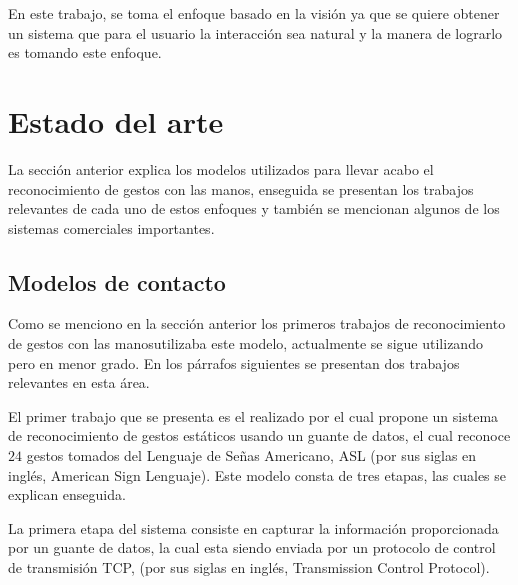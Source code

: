  


En este trabajo, se toma el enfoque basado en la visión ya que se quiere obtener un sistema que para el usuario la interacción sea natural y la manera de lograrlo es tomando este enfoque.  



\section{Estado del arte}\label{sec:EstadoDelArte} 

La sección anterior explica los modelos utilizados para llevar acabo el reconocimiento de gestos con las manos, enseguida se presentan los trabajos relevantes de cada uno de estos enfoques y también se mencionan algunos de los sistemas comerciales importantes. 

\subsection{Modelos de contacto}
 
Como se menciono en la sección anterior los primeros trabajos de reconocimiento de gestos con las manosutilizaba este modelo, actualmente se sigue utilizando pero en menor grado. En los párrafos siguientes se presentan dos trabajos relevantes en esta área. 

El primer trabajo que se presenta es el realizado por \citep{Yoon2012} el cual propone un sistema de reconocimiento de gestos estáticos usando un guante de datos, el cual reconoce $24$ gestos tomados del Lenguaje de Señas Americano, ASL (por sus siglas en inglés, American Sign Lenguaje). Este modelo consta de tres etapas, las cuales se explican enseguida. 

La primera etapa del sistema consiste en capturar la información proporcionada por un guante de datos, la cual esta siendo enviada por un protocolo de control de transmisión TCP, (por sus siglas en inglés, Transmission Control Protocol). 
 

